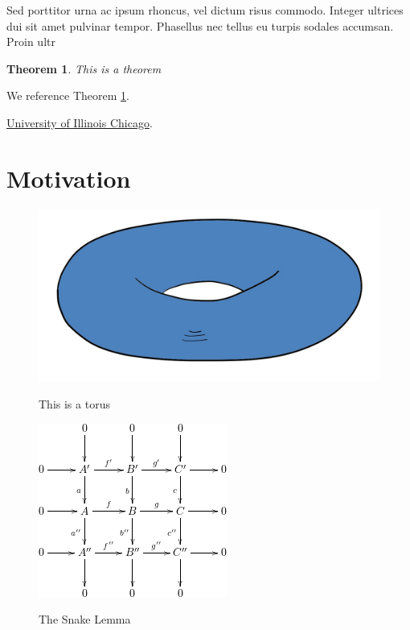 \documentclass[12pt,reqno,oneside]{amsbook}
\newtheorem{theorem}{Theorem}[chapter]
\theoremstyle{definition}
\begin{document}
Sed porttitor urna ac ipsum rhoncus, vel dictum risus commodo. Integer ultrices dui sit amet pulvinar tempor. Phasellus nec tellus eu turpis sodales accumsan. Proin ultr


\begin{theorem}\label{thm1}
This is a theorem
\end{theorem}

We reference Theorem \ref{thm1}.

\href{https://www.uic.edu}{University of Illinois Chicago}.

\section{Motivation}


\begin{figure}\label{fig1}
\includegraphics[alt="Description of Image that serves the same purpose",scale=0.3]{torus.jpg}
\caption{This is a torus}
\end{figure}



\begin{figure}\label{fig2}
\includegraphics[alt="Description of Image that serves the same purpose",scale=0.8]{figure.png}
\caption{The Snake Lemma}
\end{figure}
\end{document}
